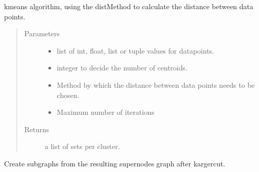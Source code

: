 \documentclass[letterpaper,10pt,english]{sphinxmanual}
\begin{document}

\begin{fulllineitems}
\label{\detokenize{clustering:clustering.kMeans}}
\sphinxAtStartPar
k\sphinxhyphen{}means algorithm, using the distMethod to calculate the distance between data points.
\begin{quote}\begin{description}
\item[{Parameters}] \leavevmode\begin{itemize}
\item {} 
\sphinxAtStartPar
{} \textendash{} list of int, float, list or tuple values for datapoints.

\item {} 
\sphinxAtStartPar
{} \textendash{} integer to decide the number of centroids.

\item {} 
\sphinxAtStartPar
{} \textendash{} Method by which the distance between data points needs to be chosen.

\item {} 
\sphinxAtStartPar
{} \textendash{} Maximum number of iterations

\end{itemize}

\item[{Returns}] \leavevmode
\sphinxAtStartPar
a list of sets per cluster.

\end{description}\end{quote}

\end{fulllineitems}


\begin{fulllineitems}
\label{\detokenize{clustering:clustering.karger2subgraph}}
\sphinxAtStartPar
Create subgraphs from the resulting supernodes graph after kargercut.

\end{fulllineitems}
\end{document}
